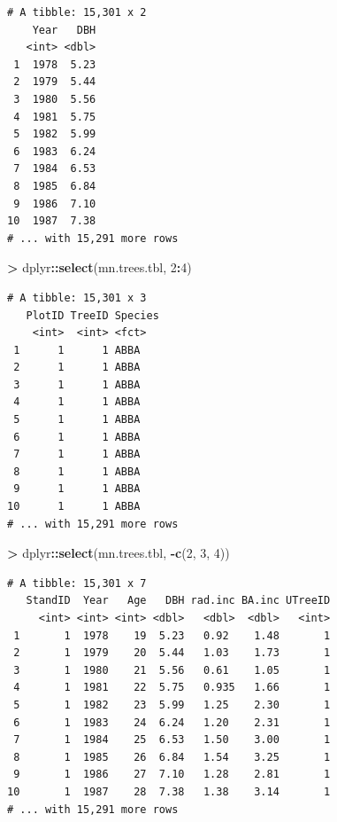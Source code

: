 \documentclass[]{krantz}
\makeatletter
\newenvironment{Shaded}{\begin{snugshade}}{\end{snugshade}}
\newcommand{\DecValTok}[1]{\textcolor[rgb]{0.06,0.06,0.06}{#1}}
\newcommand{\KeywordTok}[1]{\textcolor[rgb]{0.27,0.27,0.27}{\textbf{#1}}}
\newcommand{\NormalTok}[1]{#1}
\newcommand{\OperatorTok}[1]{\textcolor[rgb]{0.43,0.43,0.43}{\textbf{#1}}}
\newcommand{\StringTok}[1]{\textcolor[rgb]{0.5,0.5,0.5}{#1}}
\newenvironment{kframe}{%
\medskip{}
\setlength{\fboxsep}{.8em}
 \def\at@end@of@kframe{}%
 \ifinner\ifhmode%
  \def\at@end@of@kframe{\end{minipage}}%
  \begin{minipage}{\columnwidth}%
 \fi\fi%
 \def\FrameCommand##1{\hskip\@totalleftmargin \hskip-\fboxsep
 \colorbox{shadecolor}{##1}\hskip-\fboxsep
     \hskip-\linewidth \hskip-\@totalleftmargin \hskip\columnwidth}%
 \MakeFramed {\advance\hsize-\width
   \@totalleftmargin\z@ \linewidth\hsize
   \@setminipage}}%
 {\par\unskip\endMakeFramed%
 \at@end@of@kframe}
\renewenvironment{Shaded}{\begin{kframe}}{\end{kframe}}
\makeatother
\begin{document}
\begin{verbatim}
# A tibble: 15,301 x 2
    Year   DBH
   <int> <dbl>
 1  1978  5.23
 2  1979  5.44
 3  1980  5.56
 4  1981  5.75
 5  1982  5.99
 6  1983  6.24
 7  1984  6.53
 8  1985  6.84
 9  1986  7.10
10  1987  7.38
# ... with 15,291 more rows
\end{verbatim}

\begin{Shaded}
\begin{Highlighting}[]
\OperatorTok{>}\StringTok{ }\NormalTok{dplyr}\OperatorTok{::}\KeywordTok{select}\NormalTok{(mn.trees.tbl, }\DecValTok{2}\OperatorTok{:}\DecValTok{4}\NormalTok{)}
\end{Highlighting}
\end{Shaded}

\begin{verbatim}
# A tibble: 15,301 x 3
   PlotID TreeID Species
    <int>  <int> <fct>  
 1      1      1 ABBA   
 2      1      1 ABBA   
 3      1      1 ABBA   
 4      1      1 ABBA   
 5      1      1 ABBA   
 6      1      1 ABBA   
 7      1      1 ABBA   
 8      1      1 ABBA   
 9      1      1 ABBA   
10      1      1 ABBA   
# ... with 15,291 more rows
\end{verbatim}

\begin{Shaded}
\begin{Highlighting}[]
\OperatorTok{>}\StringTok{ }\NormalTok{dplyr}\OperatorTok{::}\KeywordTok{select}\NormalTok{(mn.trees.tbl, }\OperatorTok{-}\KeywordTok{c}\NormalTok{(}\DecValTok{2}\NormalTok{, }\DecValTok{3}\NormalTok{, }\DecValTok{4}\NormalTok{))}
\end{Highlighting}
\end{Shaded}

\begin{verbatim}
# A tibble: 15,301 x 7
   StandID  Year   Age   DBH rad.inc BA.inc UTreeID
     <int> <int> <int> <dbl>   <dbl>  <dbl>   <int>
 1       1  1978    19  5.23   0.92    1.48       1
 2       1  1979    20  5.44   1.03    1.73       1
 3       1  1980    21  5.56   0.61    1.05       1
 4       1  1981    22  5.75   0.935   1.66       1
 5       1  1982    23  5.99   1.25    2.30       1
 6       1  1983    24  6.24   1.20    2.31       1
 7       1  1984    25  6.53   1.50    3.00       1
 8       1  1985    26  6.84   1.54    3.25       1
 9       1  1986    27  7.10   1.28    2.81       1
10       1  1987    28  7.38   1.38    3.14       1
# ... with 15,291 more rows
\end{verbatim}
\end{document}
